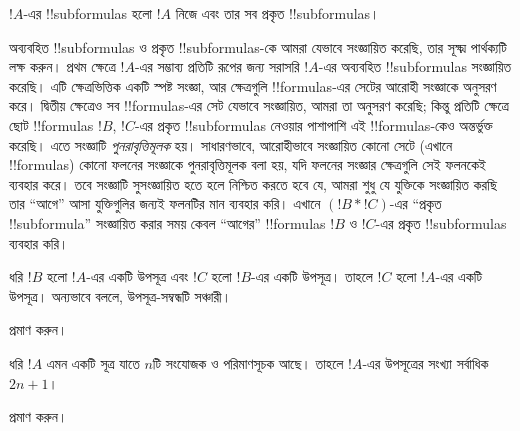\documentclass[../../../include/open-logic-section]{subfiles}
\begin{document}
\begin{defn}[!!^{subformula}]
$!A$-এর !!{subformula}s হলো $!A$ নিজে এবং তার সব প্রকৃত
!!{subformula}s।
\end{defn}

\begin{explain}
অব্যবহিত !!{subformula}s ও প্রকৃত !!{subformula}s-কে আমরা যেভাবে
সংজ্ঞায়িত করেছি, তার সূক্ষ্ম পার্থক্যটি লক্ষ করুন। প্রথম ক্ষেত্রে
$!A$-এর সম্ভাব্য প্রতিটি রূপের জন্য সরাসরি $!A$-এর অব্যবহিত
!!{subformula}s সংজ্ঞায়িত করেছি। এটি ক্ষেত্রভিত্তিক একটি স্পষ্ট
সংজ্ঞা, আর ক্ষেত্রগুলি !!{formula}s-এর সেটের আরোহী সংজ্ঞাকে অনুসরণ
করে। দ্বিতীয় ক্ষেত্রেও সব !!{formula}s-এর সেট যেভাবে সংজ্ঞায়িত,
আমরা তা অনুসরণ করেছি; কিন্তু প্রতিটি ক্ষেত্রে ছোট !!{formula}s $!B$,
$!C$-এর প্রকৃত !!{subformula}s নেওয়ার পাশাপাশি এই !!{formula}s-কেও
অন্তর্ভুক্ত করেছি। এতে সংজ্ঞাটি \emph{পুনরাবৃত্তিমূলক} হয়। সাধারণভাবে, আরোহীভাবে
সংজ্ঞায়িত কোনো সেটে (এখানে !!{formula}s) কোনো ফলনের সংজ্ঞাকে
পুনরাবৃত্তিমূলক বলা হয়, যদি ফলনের সংজ্ঞার ক্ষেত্রগুলি সেই ফলনকেই
ব্যবহার করে। তবে সংজ্ঞাটি সুসংজ্ঞায়িত হতে হলে নিশ্চিত করতে হবে যে,
আমরা শুধু যে যুক্তিকে সংজ্ঞায়িত করছি তার “আগে” আসা যুক্তিগুলির জন্যই
ফলনটির মান ব্যবহার করি। এখানে $(!B \ast !C)$-এর “প্রকৃত
!!{subformula}” সংজ্ঞায়িত করার সময় কেবল “আগের” !!{formula}s $!B$ ও
$!C$-এর প্রকৃত !!{subformula}s ব্যবহার করি।
\end{explain}

\begin{prop}
ধরি $!B$ হলো $!A$-এর একটি উপসূত্র এবং $!C$ হলো $!B$-এর একটি উপসূত্র।
তাহলে $!C$ হলো $!A$-এর একটি উপসূত্র। অন্যভাবে বললে, উপসূত্র-সম্বন্ধটি
সঞ্চারী।
\end{prop}

\begin{prob}
 প্রমাণ করুন।
\end{prob}

\begin{prop}
ধরি $!A$ এমন একটি সূত্র যাতে $n$টি সংযোজক ও পরিমাণসূচক আছে।
তাহলে $!A$-এর উপসূত্রের সংখ্যা সর্বাধিক $2n+1$।
\end{prop}

\begin{prob}
 প্রমাণ করুন।
\end{prob}
\end{document}
